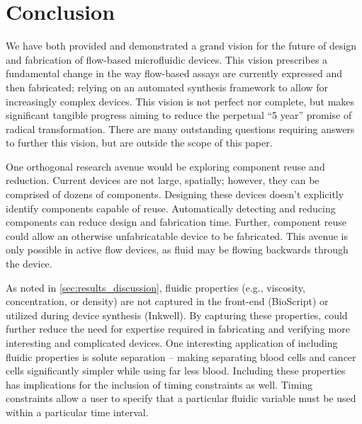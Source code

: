 
\section{Conclusion}
\label{sec:conclusion}

We have both provided and demonstrated a grand vision for the future of design and fabrication of flow-based microfluidic devices.
This vision prescribes a fundamental change in the way flow-based assays are currently expressed and then fabricated; relying on an automated synthesis framework to allow for increasingly complex devices.
This vision is not perfect nor complete, but makes significant tangible progress aiming to reduce the perpetual ``5 year'' promise of radical transformation.
There are many outstanding questions requiring answers to further this vision, but are outside the scope of this paper.

One orthogonal research avenue would be exploring component reuse and reduction.
Current devices are not large, spatially; however, they can be comprised of dozens of components.
Designing these devices doesn't explicitly identify components capable of reuse.
Automatically detecting and reducing components can reduce design and fabrication time.
Further, component reuse could allow an otherwise unfabricatable device to be fabricated.
This avenue is only possible in active flow devices, as fluid may be flowing backwards through the device.

As noted in \cref{sec:results_discussion}, fluidic properties (e.g., viscosity, concentration, or density) are not captured in the front-end (BioScript) or utilized during device synthesis (Inkwell).
By capturing these properties, \tool{} could further reduce the need for expertise required in fabricating and verifying more interesting and complicated devices.
One interesting application of including fluidic properties is solute separation -- making separating blood cells and cancer cells significantly simpler while using far less blood.
Including these properties has implications for the inclusion of timing constraints as well.
Timing constraints allow a user to specify that a particular fluidic variable must be used within a particular time interval.

